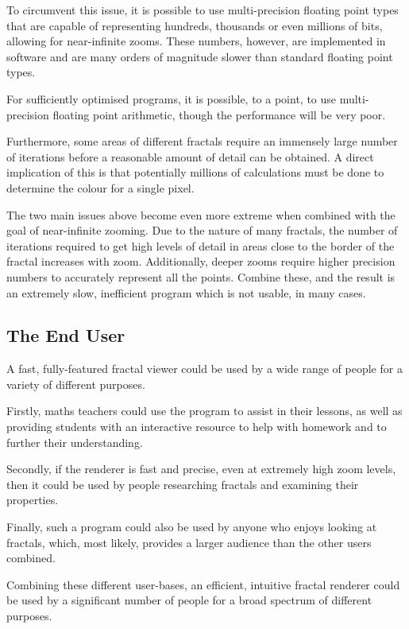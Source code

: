 \begin{multicols}{2}
To circumvent this issue, it is possible to use multi-precision floating point types that are capable of representing hundreds, thousands or even millions of bits, allowing for near-infinite zooms. These numbers, however, are implemented in software and are many orders of magnitude slower than standard floating point types.

For sufficiently optimised programs, it is possible, to a point, to use multi-precision floating point arithmetic, though the performance will be very poor.

Furthermore, some areas of different fractals require an immensely large number of iterations before a reasonable amount of detail can be obtained. A direct implication of this is that potentially millions of calculations must be done to determine the colour for a single pixel.

The two main issues above become even more extreme when combined with the goal of near-infinite zooming. Due to the nature of many fractals, the number of iterations required to get high levels of detail in areas close to the border of the fractal increases with zoom. Additionally, deeper zooms require higher precision numbers to accurately represent all the points. Combine these, and the result is an extremely slow, inefficient program which is not usable, in many cases.

\end{multicols}

\subsection{The End User}

A fast, fully-featured fractal viewer could be used by a wide range of people for a variety of different purposes.

Firstly, maths teachers could use the program to assist in their lessons, as well as providing students with an interactive resource to help with homework and to further their understanding.

Secondly, if the renderer is fast and precise, even at extremely high zoom levels, then it could be used by people researching fractals and examining their properties.

Finally, such a program could also be used by anyone who enjoys looking at fractals, which, most likely, provides a larger audience than the other users combined.

Combining these different user-bases, an efficient, intuitive fractal renderer could be used by a significant number of people for a broad spectrum of different purposes.

